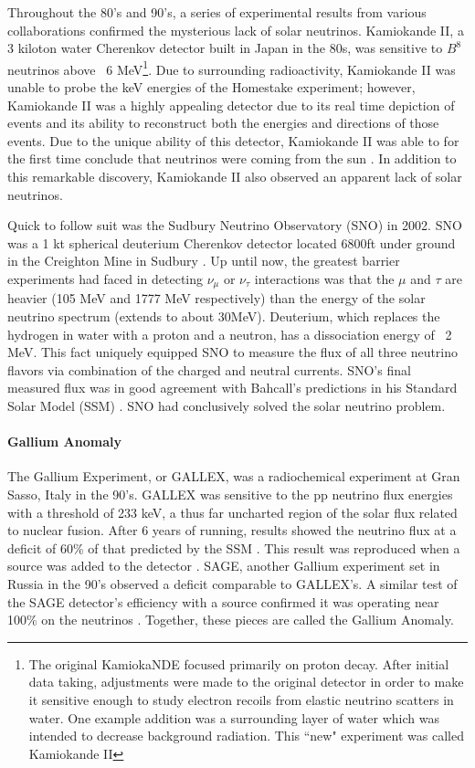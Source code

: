 \documentclass[12pt]{article}
\begin{document}
\par Throughout the 80's and 90's, a series of experimental results from various collaborations confirmed the mysterious lack of solar neutrinos. Kamiokande II, a 3 kiloton water Cherenkov detector built in Japan in the 80s, was sensitive to $B^8$ neutrinos above ~6 MeV\footnote{The original KamiokaNDE focused primarily on proton decay. After initial data taking, adjustments were made to the original detector in order to make it sensitive enough to study electron recoils from elastic neutrino scatters in water. One example addition was a surrounding layer of water which was intended to decrease background radiation.  This ``new" experiment was called Kamiokande II}. Due to surrounding radioactivity, Kamiokande II was unable to probe the keV energies of the Homestake experiment; however, Kamiokande II was a highly appealing detector due to its real time depiction of events and its ability to reconstruct both the energies and directions of those events. Due to the unique ability of this detector, Kamiokande II was able to for the first time conclude that neutrinos were coming from the sun \cite{kam0}.  In addition to this remarkable discovery, Kamiokande II also observed an apparent lack of solar neutrinos.
\par Quick to follow suit was the Sudbury Neutrino Observatory (SNO) in 2002.  SNO was a 1 kt spherical deuterium Cherenkov detector located 6800ft under ground in the Creighton Mine in Sudbury \cite{sno}. Up until now, the greatest barrier experiments had faced in detecting $\nu_\mu$ or $\nu_\tau$ interactions was that the $\mu$ and $\tau$ are heavier (105 MeV and 1777 MeV respectively) than the energy of the solar neutrino spectrum (extends to about 30MeV). Deuterium, which replaces the hydrogen in water with a proton and a neutron, has a dissociation energy of ~2 MeV. This fact uniquely equipped SNO to measure the flux of all three neutrino flavors via combination of the charged and neutral currents. SNO's final measured flux was in good agreement with Bahcall's predictions in his Standard Solar Model (SSM) \cite{sno}.  SNO had conclusively solved the solar neutrino problem.  
\paragraph{Gallium Anomaly} The Gallium Experiment, or GALLEX, was a radiochemical experiment at Gran Sasso, Italy in the 90's. GALLEX was sensitive to the pp neutrino flux energies with a threshold of 233 keV, a thus far uncharted region of the solar flux related to nuclear fusion. After 6 years of running, results showed the neutrino flux at a deficit of 60\% of that predicted by the SSM \cite{gal0}. This result was reproduced when a  source was added to the detector \cite{gal2}. SAGE, another Gallium experiment set in Russia in the 90's observed a deficit comparable to GALLEX's.  A similar test of the SAGE detector's efficiency with a  source confirmed it was operating near 100\% on the  neutrinos \cite{sage}.  Together, these pieces are called the Gallium Anomaly.  
\end{document}

